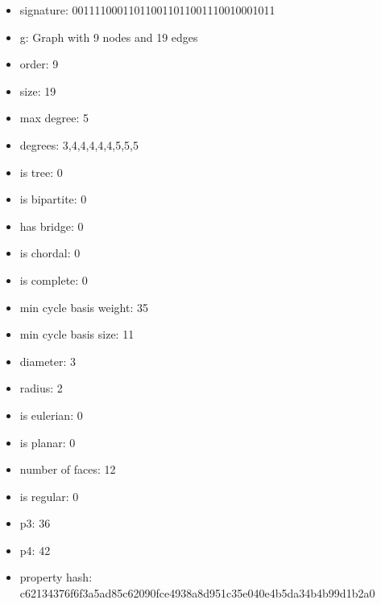 \newpage
\begin{figure}
\end{figure}
\begin{itemize}
\item signature: 001111000110110011011001110010001011
\item g: Graph with 9 nodes and 19 edges
\item order: 9
\item size: 19
\item max degree: 5
\item degrees: 3,4,4,4,4,4,5,5,5
\item is tree: 0
\item is bipartite: 0
\item has bridge: 0
\item is chordal: 0
\item is complete: 0
\item min cycle basis weight: 35
\item min cycle basis size: 11
\item diameter: 3
\item radius: 2
\item is eulerian: 0
\item is planar: 0
\item number of faces: 12
\item is regular: 0
\item p3: 36
\item p4: 42
\item property hash: c62134376f6f3a5ad85c62090fce4938a8d951c35e040e4b5da34b4b99d1b2a0
\end{itemize}
